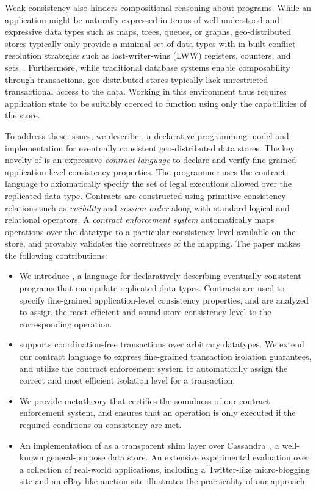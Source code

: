 Weak consistency also hinders compositional reasoning about programs.  While
an application might be naturally expressed in terms of well-understood and
expressive data types such as maps, trees, queues, or graphs,
geo-distributed stores typically only provide a minimal set of data types
with in-built conflict resolution strategies such as last-writer-wins (LWW)
registers, counters, and sets~\cite{Cassandra,DynamoDB}.  Furthermore, while
traditional database systems enable composability through transactions,
geo-distributed stores typically lack unrestricted transactional access to
the data.  Working in this environment thus requires application state to be
suitably coerced to function using only the capabilities of the store.

To address these issues, we describe \name, a declarative programming model
and implementation for eventually consistent geo-distributed data
stores. The key novelty of \name is an expressive \emph{contract language}
to declare and verify fine-grained application-level consistency
properties. The programmer uses the contract language to axiomatically
specify the set of legal executions allowed over the replicated data
type. Contracts are constructed using primitive consistency relations such
as \emph{visibility} and \emph{session order} along with standard logical
and relational operators. A \emph{contract enforcement system} automatically
maps operations over the datatype to a particular consistency level
available on the store, and provably validates the correctness of the
mapping.  The paper makes the following contributions:

\begin{itemize}
\setlength{\itemsep}{2pt}
\item We introduce \name, a language for declaratively describing eventually
	consistent programs that manipulate replicated data types. Contracts are used
	to specify fine-grained application-level consistency properties, and are
	analyzed to assign the most efficient and sound store consistency level to
	the corresponding operation.
\item \name supports coordination-free transactions over arbitrary datatypes.
	We extend our contract language to express fine-grained transaction isolation
	guarantees, and utilize the contract enforcement system to automatically
	assign the correct and most efficient isolation level for a transaction.
\item We provide metatheory that certifies the soundness of our contract
	enforcement system, and ensures that an operation is only executed if the
	required conditions on consistency are met.
\item An implementation of \name as a transparent shim layer over
	Cassandra~\cite{Cassandra}, a well-known general-purpose data store.  An
	extensive experimental evaluation over a collection of real-world
	applications, including a Twitter-like micro-blogging site and an eBay-like
	auction site illustrates the practicality of our approach.
\end{itemize}

